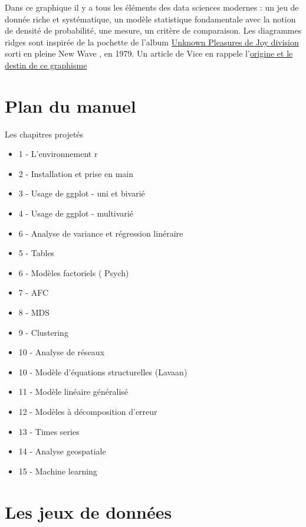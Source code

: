 \documentclass[
]{book}
\providecommand{\tightlist}{%
  \setlength{\itemsep}{0pt}\setlength{\parskip}{0pt}}
\begin{document}
Dans ce graphique il y a tous les éléments des data sciences modernes : un jeu de donnée riche et systématique, un modèle statistique fondamentale avec la notion de densité de probabilité, une mesure, un critère de comparaison. Les diagrammes ridges sont inspirée de la pochette de l'album \href{https://www.youtube.com/watch?v=7PtvIr2oiaE}{Unknown Pleasures de Joy division} sorti en pleine New Wave , en 1979. Un article de Vice en rappele l'\href{https://i-d.vice.com/fr/article/pabjam/pourquoi-cette-pochette-dalbum-de-joy-division-a-inspire-le-monde-entier}{origine et le destin de ce graphisme}

\hypertarget{plan-du-manuel}{%
\section{Plan du manuel}\label{plan-du-manuel}}

Les chapitres projetés

\begin{itemize}
\tightlist
\item
  1 - L'environnement r
\item
  2 - Installation et prise en main
\item
  3 - Usage de ggplot - uni et bivarié
\item
  4 - Usage de ggplot - multivarié
\item
  6 - Analyse de variance et régression linéraire
\item
  5 - Tables
\item
  6 - Modèles factoriels ( Psych)
\item
  7 - AFC
\item
  8 - MDS
\item
  9 - Clustering
\item
  10 - Analyse de réseaux
\item
  10 - Modèle d'équations structurelles (Lavaan)
\item
  11 - Modèle linéaire généralisé
\item
  12 - Modèles à décomposition d'erreur
\item
  13 - Times series
\item
  14 - Analyse geospatiale
\item
  15 - Machine learning
\end{itemize}

\hypertarget{les-jeux-de-donnuxe9es}{%
\section{Les jeux de données}\label{les-jeux-de-donnuxe9es}}
\end{document}
